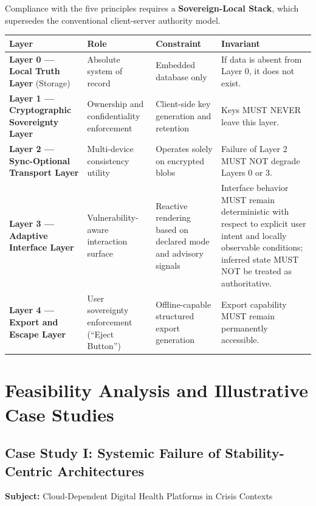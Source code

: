 \documentclass[12pt]{article}
\begin{document}
Compliance with the five principles requires a \textbf{Sovereign-Local Stack},
which supersedes the conventional client-server authority model.

\begin{center}
\begin{tabular}{@{}lllp{4cm}@{}}
\toprule
Layer & Role & Constraint & Invariant \\
\midrule
\textbf{Layer 0 --- Local Truth Layer} (Storage) & Absolute system of record & Embedded database only & If data is absent from Layer 0, it does not exist. \\
\midrule
\textbf{Layer 1 --- Cryptographic Sovereignty Layer} & Ownership and confidentiality enforcement & Client-side key generation and retention & Keys MUST NEVER leave this layer. \\
\midrule
\textbf{Layer 2 --- Sync-Optional Transport Layer} & Multi-device consistency utility & Operates solely on encrypted blobs & Failure of Layer 2 MUST NOT degrade Layers 0 or 3. \\
\midrule
\textbf{Layer 3 --- Adaptive Interface Layer} & Vulnerability-aware interaction surface & Reactive rendering based on declared mode and advisory signals & Interface behavior MUST remain deterministic with respect to explicit user intent and locally observable conditions; inferred state MUST NOT be treated as authoritative. \\
\midrule
\textbf{Layer 4 --- Export and Escape Layer} & User sovereignty enforcement (``Eject Button'') & Offline-capable structured export generation & Export capability MUST remain permanently accessible. \\
\bottomrule
\end{tabular}
\end{center}

\section{Feasibility Analysis and Illustrative Case Studies}

\subsection{Case Study I: Systemic Failure of Stability-Centric Architectures}
\textbf{Subject:} Cloud-Dependent Digital Health Platforms in Crisis Contexts
\end{document}
